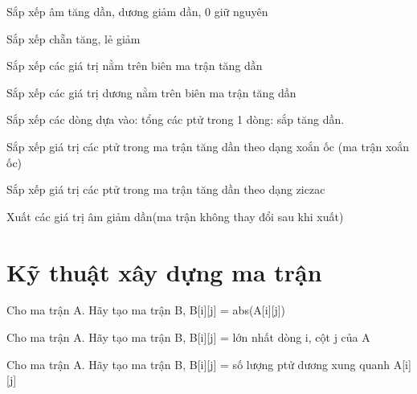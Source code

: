 \begin{problem}
    Sắp xếp âm tăng dần, dương giảm dần, 0 giữ nguyên
\end{problem}
\begin{problem}
    Sắp xếp chẵn tăng, lẻ giảm
\end{problem}
\begin{problem}
    Sắp xếp các giá trị nằm trên biên ma trận tăng dần
\end{problem}
\begin{problem}
    Sắp xếp các giá trị dương nằm trên biên ma trận tăng dần
\end{problem}
\begin{problem}
    Sắp xếp các dòng dựa vào: tổng các ptử trong 1 dòng: sắp tăng dần.
\end{problem}
\begin{problem}
    Sắp xếp giá trị các ptử trong ma trận tăng dần theo dạng xoắn ốc (ma trận xoắn ốc)
\end{problem}
\begin{problem}
    Sắp xếp giá trị các ptử trong ma trận tăng dần theo dạng ziczac
\end{problem}
\begin{problem}
    Xuất các giá trị âm  giảm dần(ma trận không thay đổi sau khi xuất)
\end{problem}

\section{Kỹ thuật xây dựng ma trận}
\begin{problem}
    Cho ma trận A. Hãy tạo ma trận B, B[i][j] = abs(A[i][j])
\end{problem}
\begin{problem}
    Cho ma trận A. Hãy tạo ma trận B, B[i][j] = lớn nhất dòng i, cột j của A
\end{problem}
\begin{problem}
    Cho ma trận A. Hãy tạo ma trận B, B[i][j] = số lượng ptử dương xung quanh A[i][j]
\end{problem}

